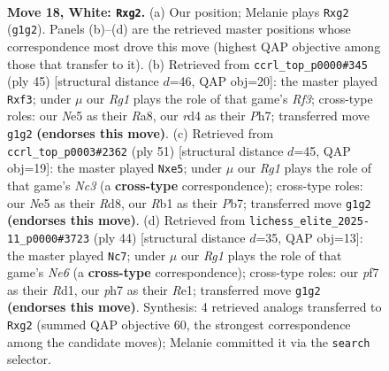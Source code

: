 \documentclass[11pt]{article}
\begin{document}
\clearpage

\begin{figure}[p]\centering
\begin{subfigure}{0.46\textwidth}\centering
\resizebox{\linewidth}{!}{%
\newchessgame
\chessboard[
  setfen={2k4r/ppp2ppp/4p3/4N3/2Pr4/8/PP2KPbP/1R4R1 w - - 0 18},
  showmover=false,
  pgfstyle=straightmove, color=movearrow, markmove={g1-g2}
]}
\caption{}
\end{subfigure}\hfill
\begin{subfigure}{0.46\textwidth}\centering
\resizebox{\linewidth}{!}{%
\newchessgame
\chessboard[
  setfen={r5k1/6pp/p2R1r2/2B1p2n/2p5/P4P2/1PP4P/1K5R b - - 0 23},
  showmover=false,
  pgfstyle=straightmove, color=movearrow, markmove={f6-f3}
]}
\caption{}
\end{subfigure}
\\[4pt]
\begin{subfigure}{0.46\textwidth}\centering
\resizebox{\linewidth}{!}{%
\newchessgame
\chessboard[
  setfen={3r2k1/1pp3pp/p1n5/3pR1P1/8/BPP5/P4PP1/3R2K1 b - - 0 26},
  showmover=false,
  pgfstyle=straightmove, color=movearrow, markmove={c6-e5}
]}
\caption{}
\end{subfigure}\hfill
\begin{subfigure}{0.46\textwidth}\centering
\resizebox{\linewidth}{!}{%
\newchessgame
\chessboard[
  setfen={r5k1/pp4bp/4N2p/3p1r2/4p3/8/PP3P1P/3RR1K1 w - - 2 23},
  showmover=false,
  pgfstyle=straightmove, color=movearrow, markmove={e6-c7}
]}
\caption{}
\end{subfigure}
\caption{\textbf{Move 18, White: \texttt{Rxg2}.} (a) Our position; Melanie plays \texttt{Rxg2} (\texttt{g1g2}). Panels (b)--(d) are the retrieved master positions whose correspondence most drove this move (highest QAP objective among those that transfer to it). (b) Retrieved from \texttt{ccrl\_top\_p0000\#345} (ply 45) [structural distance $d$=46, QAP obj=20]: the master played \texttt{Rxf3}; under $\mu$ our \emph{Rg1} plays the role of that game's \emph{Rf3}; cross-type roles: our \emph{N}e5 as their \emph{R}a8, our \emph{r}d4 as their \emph{P}h7; transferred move \texttt{g1g2} \textbf{(endorses this move)}. (c) Retrieved from \texttt{ccrl\_top\_p0003\#2362} (ply 51) [structural distance $d$=45, QAP obj=19]: the master played \texttt{Nxe5}; under $\mu$ our \emph{Rg1} plays the role of that game's \emph{Nc3} (a \textbf{cross-type} correspondence); cross-type roles: our \emph{N}e5 as their \emph{R}d8, our \emph{R}b1 as their \emph{P}b7; transferred move \texttt{g1g2} \textbf{(endorses this move)}. (d) Retrieved from \texttt{lichess\_elite\_2025-11\_p0000\#3723} (ply 44) [structural distance $d$=35, QAP obj=13]: the master played \texttt{Nc7}; under $\mu$ our \emph{Rg1} plays the role of that game's \emph{Ne6} (a \textbf{cross-type} correspondence); cross-type roles: our \emph{p}f7 as their \emph{R}d1, our \emph{p}h7 as their \emph{R}e1; transferred move \texttt{g1g2} \textbf{(endorses this move)}. Synthesis: 4 retrieved analogs transferred to \texttt{Rxg2} (summed QAP objective 60, the strongest correspondence among the candidate moves); Melanie committed it via the \texttt{search} selector.}
\label{fig:thought-m34}
\end{figure}
\end{document}
